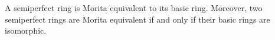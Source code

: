 A semiperfect ring is Morita equivalent to its basic ring. Moreover, two semiperfect rings are Morita equivalent if and only if their basic rings are isomorphic.
